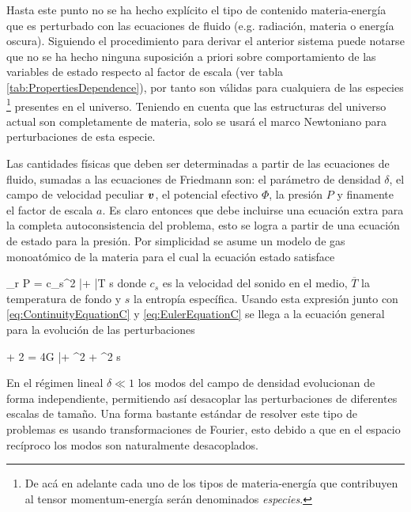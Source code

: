 Hasta este punto no se ha hecho explícito el tipo de contenido 
materia-energía que es perturbado con las ecuaciones de fluido (e.g. 
radiación, materia o energía oscura). Siguiendo el procedimiento para 
derivar el anterior sistema puede notarse que no se ha hecho ninguna 
suposición a priori sobre comportamiento de las variables de estado respecto
al factor de escala (ver tabla \ref{tab:PropertiesDependence}), por tanto 
son válidas para cualquiera de las especies
\footnote{De acá en adelante cada uno de los tipos de materia-energía que 
contribuyen al tensor momentum-energía serán denominados \textit{especies}.} 
presentes en el universo. Teniendo en cuenta que las estructuras del universo 
actual son completamente de materia, solo se usará el marco Newtoniano para 
perturbaciones de esta especie.


Las cantidades físicas que deben ser determinadas a partir de las ecuaciones
de fluido, sumadas a las ecuaciones de Friedmann son: el parámetro de 
densidad $\delta$, el campo de velocidad peculiar $\boldsymbol{ v }$, el potencial
efectivo $\Phi$, la presión $P$ y finamente el factor de escala $a$. Es 
claro entonces que debe incluirse una ecuación extra para la completa
autoconsistencia del problema, esto se logra a partir de una ecuación de 
estado para la presión. Por simplicidad se asume un modelo de gas 
monoatómico de la materia para el cual la ecuación estado satisface


{ \nabla_r P = c_s^2 \bar \rho \nabla \delta + 
\bar T \rho \nabla s }
donde $c_s$ es la velocidad del sonido en el medio, $\overline T$ la 
temperatura de fondo y $s$ la entropía específica. Usando esta expresión 
junto con \ref{eq:ContinuityEquationC} y \ref{eq:EulerEquationC} se llega
a la ecuación general para la evolución de las perturbaciones


{  + 2  = 
4\pi G \bar \rho \delta + \nabla^2 \delta +
\nabla^2 s }


En el régimen lineal $\delta \ll 1$ los modos del campo de densidad 
evolucionan de forma independiente, permitiendo así desacoplar las
perturbaciones de diferentes escalas de tamaño. Una forma bastante estándar 
de resolver este tipo de problemas es usando transformaciones de Fourier, 
esto debido a que en el espacio recíproco los modos son naturalmente 
desacoplados.


